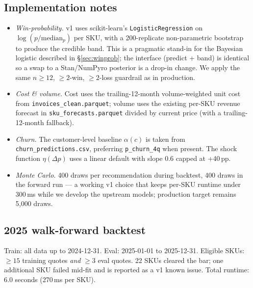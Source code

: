 \documentclass[11pt,a4paper]{article}
\begin{document}
\subsection{Implementation notes}
\begin{itemize}[leftmargin=2em,itemsep=2pt]
\item \emph{Win-probability.} v1 uses scikit-learn's \texttt{LogisticRegression} on $\log(p/\text{median}_p)$ per SKU, with a 200-replicate non-parametric bootstrap to produce the credible band. This is a pragmatic stand-in for the Bayesian logistic described in §\ref{sec:winprob}; the interface (predict + band) is identical so a swap to a Stan/NumPyro posterior is a drop-in change. We apply the same $n\geq 12$, $\geq 2$-win, $\geq 2$-loss guardrail as in production.
\item \emph{Cost \& volume.} Cost uses the trailing-12-month volume-weighted unit cost from \texttt{invoices\_clean.parquet}; volume uses the existing per-SKU revenue forecast in \texttt{sku\_forecasts.parquet} divided by current price (with a trailing-12-month fallback).
\item \emph{Churn.} The customer-level baseline $\alpha(c)$ is taken from \texttt{churn\_predictions.csv}, preferring \texttt{p\_churn\_4q} when present. The shock function $\eta(\Delta p)$ uses a linear default with slope 0.6 capped at +40\,pp.
\item \emph{Monte Carlo.} 400 draws per recommendation during backtest, 400 draws in the forward run --- a working v1 choice that keeps per-SKU runtime under 300\,ms while we develop the upstream models; production target remains 5{,}000 draws.
\end{itemize}

\subsection{2025 walk-forward backtest}
\label{sec:backtest2025}

Train: all data up to 2024-12-31. Eval: 2025-01-01 to 2025-12-31. Eligible SKUs: $\geq 15$ training quotes \emph{and} $\geq 3$ eval quotes. 22 SKUs cleared the bar; one additional SKU failed mid-fit and is reported as a v1 known issue. Total runtime: 6.0 seconds (270\,ms per SKU).
\end{document}
